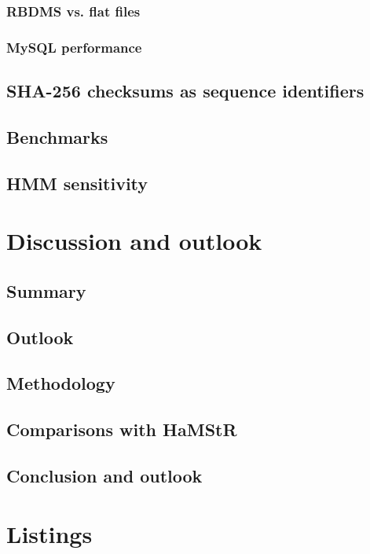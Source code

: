 \documentclass[a4paper]{scrreprt}
\newcommand{\hamstr}{HaMStR\xspace}
\begin{document}
		\subsection{RBDMS vs. flat files}
		\subsection{MySQL performance}
	\section{SHA-256 checksums as sequence identifiers}
		
	\section{Benchmarks}
	\section{HMM sensitivity}
\chapter{Discussion and outlook}
	\section{Summary}
	\section{Outlook}
\clearpage

\section{Methodology}
\clearpage

\section{Comparisons with \hamstr}
\clearpage

\section{Conclusion and outlook}
\clearpage




\appendix

\chapter{Listings}
%


\end{document}
